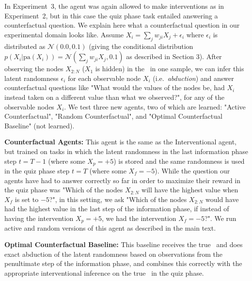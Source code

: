 In Experiment~3, the agent was again allowed to make interventions as in Experiment~2, but in this case the quiz phase task entailed answering a counterfactual question. We explain here what a counterfactual question in our experimental domain looks like. Assume $X_i = \sum_{j} w_{ji}X_{j} + \epsilon_i$ where $\epsilon_i$ is distributed as $\mathcal{N}(0.0, 0.1)$ (giving the conditional distribution $p(X_i \vert \textrm{pa}(X_{i})) = \mathcal{N}(\sum_{j} w_{ji}X_{j},0.1)$ as described in Section 3). After observing the nodes $X_{2:N}$ ($X_{1}$ is hidden) in the \CBN~in one sample, we can infer this latent randomness $\epsilon_i$ for each observable node $X_i$ (i.e.~\textit{abduction}) and answer counterfactual questions like "What would the values of the nodes be, had $X_i$ instead taken on a different value than what we observed?", for any of the observable nodes $X_i$. We test three new agents, two of which are learned: "Active Counterfactual", "Random Counterfactual", and "Optimal Counterfactual Baseline" (not learned).


\textbf{Counterfactual Agents:}
This agent is the same as the Interventional agent, but trained on tasks in which the latent randomness in the last information phase step $t = T-1$ (where some $X_p=+5$) is stored and the same randomness is used in the quiz phase step $t = T$ (where some $X_f=-5$). While the question our agents have had to answer correctly so far in order to maximize their reward in the quiz phase was "Which of the nodes $X_{2:N}$ will have the highest value when $X_f$ is set to $-5$?", in this setting, we ask "Which of the nodes $X_{2:N}$ would have had the highest value in the last step of the information phase, if instead of having the intervention $X_p=+5$,  we had the intervention $X_f = -5$?".
We run active and random versions of this agent as described in the main text.

\textbf{Optimal Counterfactual Baseline:}
This baseline receives the true \CBN~and does exact abduction of the latent randomness based on observations from the penultimate step of the information phase, and combines this correctly with the appropriate interventional inference on the true \CBN~in the quiz phase.


